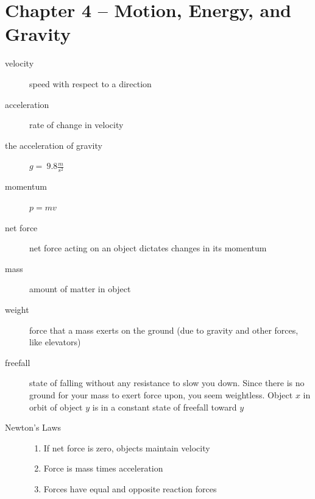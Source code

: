 \documentclass[12pt]{article}
\begin{document}
\section{Chapter 4 -- Motion, Energy, and Gravity}
\begin{description}
\item[velocity] speed with respect to a direction
\item[acceleration] rate of change in velocity
\item[the acceleration of gravity] $g = ~9.8 \frac{m}{s^2}$
\item[momentum] $p = mv$
\item[net force] net force acting on an object dictates changes in its momentum
\item[mass] amount of matter in object
\item[weight] force that a mass exerts on the ground (due to gravity and other forces, like elevators)
\item[freefall] state of falling without any resistance to slow you down. Since there is no ground for your mass to exert force upon, you seem weightless. Object $x$ in orbit of object $y$ is in a constant state of freefall toward $y$
\item[Newton's Laws]
\begin{enumerate}
\item If net force is zero, objects maintain velocity
\item Force is mass times acceleration
\item Forces have equal and opposite reaction forces
\end{enumerate}
\end{description}
\end{document}
